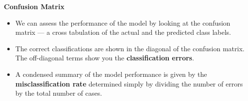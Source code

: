 \documentclass[MASTER.tex]{subfiles}
\begin{document}
\begin{frame}
	\Large
\textbf{Confusion Matrix}
\begin{itemize}
\item We can assess the performance of the model by looking at the confusion matrix — a cross tabulation of the actual and the predicted class labels. 

\item The correct classifications are shown in the diagonal of the confusion matrix. The off-diagonal terms show you the \textbf{classification errors}. 
\item A condensed summary of the model performance is given by the \textbf{misclassification rate} determined simply by dividing the number of errors by the total number of cases.
\end{itemize}

\end{frame}
\end{document}
